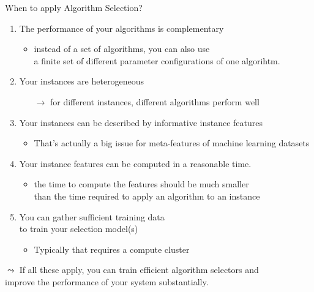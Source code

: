 % 
% 
% 
\begin{frame}[c]{When to apply Algorithm Selection?}

\begin{enumerate}
  \item The performance of your algorithms is \alert{complementary}
  \begin{itemize}
    \item instead of a set of algorithms, you can also use\\ a finite set of different parameter configurations of one algorihtm.
  \end{itemize}
  \pause
  \item Your instances are \alert{heterogeneous}
  \begin{itemize}
    \item[$\to$] for different instances, different algorithms perform well
  \end{itemize}
  \pause
  \item Your instances can be described by \alert{informative instance features}
  \begin{itemize}
    \item That's actually a big issue for meta-features of machine learning datasets
  \end{itemize}
  \pause
  \item Your instance features can be \alert{computed in a reasonable time.}
  \begin{itemize}
    \item the time to compute the features should be much smaller\\ than the time required to apply an algorithm to an instance
  \end{itemize}
  \item You can gather sufficient \alert{training data}\\ to train your selection model(s)
  \begin{itemize}
    \item Typically that requires a compute cluster
  \end{itemize}
\end{enumerate}

\pause
$\leadsto$ \alert{If all these apply, you can train efficient algorithm selectors
and\\ improve the performance of your system substantially.}

\end{frame}
